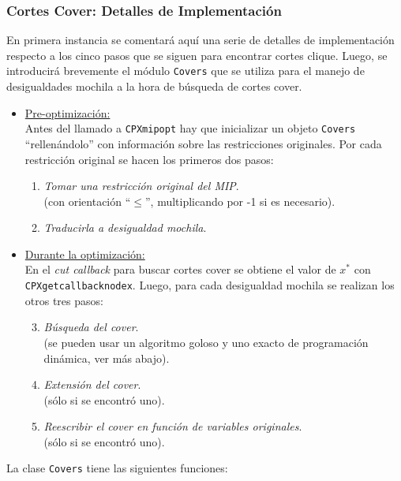 \subsubsection{Cortes Cover: Detalles de Implementación}

En primera instancia se comentará aquí una serie de detalles de implementación respecto a los cinco pasos que se siguen para encontrar cortes clique. Luego, se introducirá brevemente el módulo \verb_Covers_ que se utiliza para el manejo de desigualdades mochila a la hora de búsqueda de cortes cover.

\begin{itemize}
\item \underline{Pre-optimización:}\\
Antes del llamado a \verb_CPXmipopt_ hay que inicializar un objeto \verb_Covers_ ``rellenándolo'' con información sobre las restricciones originales. Por cada restricción original se hacen los primeros dos pasos:
	\begin{enumerate}[1{)}]
	\item \emph{Tomar una restricción original del MIP}.\\
		(con orientación ``$\leq$'', multiplicando por -1 si es necesario).
	\item \emph{Traducirla a desigualdad mochila}.
	\end{enumerate}

\item \underline{Durante la optimización:}\\
En el \emph{cut callback} para buscar cortes cover se obtiene el valor de $x^*$ con \verb_CPXgetcallbacknodex_. Luego, para cada desigualdad mochila se realizan los otros tres pasos:
	\begin{enumerate}[1{)}]
	\setcounter{enumi}{2}
	\item \emph{Búsqueda del cover}.\\
		(se pueden usar un algoritmo goloso y uno exacto de programación dinámica, ver más abajo).
	\item \emph{Extensión del cover}.\\
		(sólo si se encontró uno).
	\item \emph{Reescribir el cover en función de variables originales}.\\
		(sólo si se encontró uno).
	\end{enumerate}
\end{itemize}

La clase \verb_Covers_ tiene las siguientes funciones:

